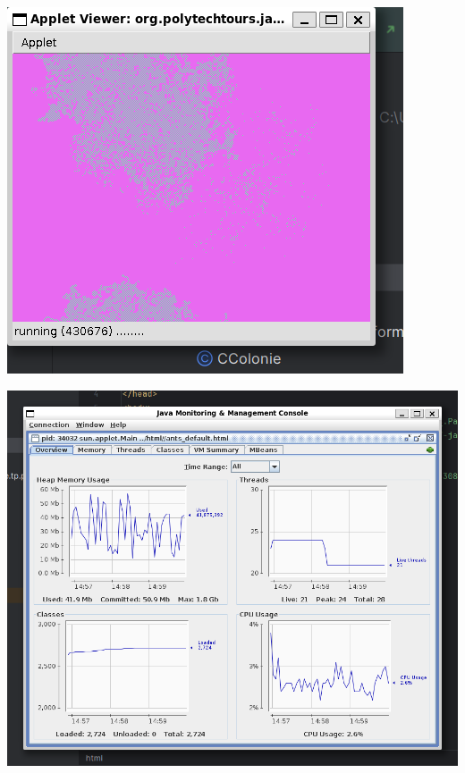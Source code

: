 \documentclass[a4paper,12pt]{article}
\begin{document}
\includegraphics[scale=0.75]{images/appletSansModification.png}

\includegraphics[scale=0.5]{images/jconsole_sans_modif.png}
\end{document}
